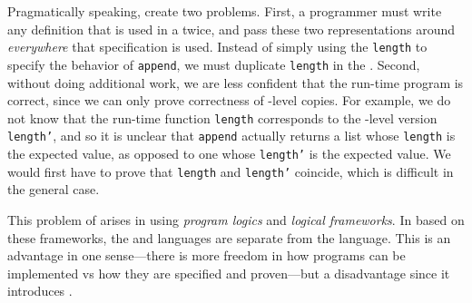 Pragmatically speaking,  create two problems.
First, a programmer must write any definition that is used in a
 twice, and pass these two representations around
\emph{everywhere} that specification is used.
Instead of simply using the  \texttt{length} to specify the
behavior of \texttt{append}, we must duplicate
\texttt{length} in the .
Second, without doing additional work, we are less confident that the run-time
program is correct, since we can only prove correctness of -level
copies.
For example, we do not know that the run-time function \texttt{length}
corresponds to the -level version \texttt{length'}, and so
it is unclear that \texttt{append} actually returns a list whose
\texttt{length} is the expected value, as opposed to one whose
\texttt{length'} is the expected value.
We would first have to prove that \texttt{length} and
\texttt{length'} coincide, which is difficult in the general case.

This problem of  arises in 
using \emph{program logics} and \emph{logical frameworks}.
In  based on these frameworks, the
 and  languages are separate from the
 language.
This is an advantage in one sense---there is more freedom in how programs can be
implemented vs how they are specified and proven---but a disadvantage since it
introduces .

